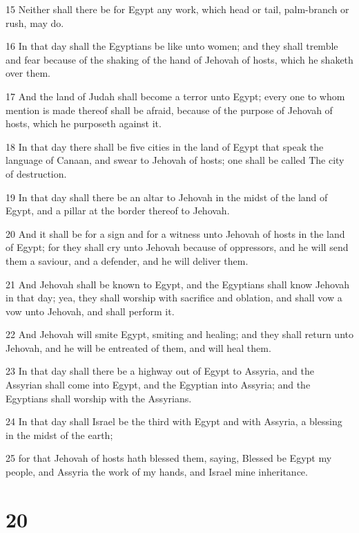 \par 15 Neither shall there be for Egypt any work, which head or tail, palm-branch or rush, may do.
\par 16 In that day shall the Egyptians be like unto women; and they shall tremble and fear because of the shaking of the hand of Jehovah of hosts, which he shaketh over them.
\par 17 And the land of Judah shall become a terror unto Egypt; every one to whom mention is made thereof shall be afraid, because of the purpose of Jehovah of hosts, which he purposeth against it.
\par 18 In that day there shall be five cities in the land of Egypt that speak the language of Canaan, and swear to Jehovah of hosts; one shall be called The city of destruction.
\par 19 In that day shall there be an altar to Jehovah in the midst of the land of Egypt, and a pillar at the border thereof to Jehovah.
\par 20 And it shall be for a sign and for a witness unto Jehovah of hosts in the land of Egypt; for they shall cry unto Jehovah because of oppressors, and he will send them a saviour, and a defender, and he will deliver them.
\par 21 And Jehovah shall be known to Egypt, and the Egyptians shall know Jehovah in that day; yea, they shall worship with sacrifice and oblation, and shall vow a vow unto Jehovah, and shall perform it.
\par 22 And Jehovah will smite Egypt, smiting and healing; and they shall return unto Jehovah, and he will be entreated of them, and will heal them.
\par 23 In that day shall there be a highway out of Egypt to Assyria, and the Assyrian shall come into Egypt, and the Egyptian into Assyria; and the Egyptians shall worship with the Assyrians.
\par 24 In that day shall Israel be the third with Egypt and with Assyria, a blessing in the midst of the earth;
\par 25 for that Jehovah of hosts hath blessed them, saying, Blessed be Egypt my people, and Assyria the work of my hands, and Israel mine inheritance.

\chapter{20}

